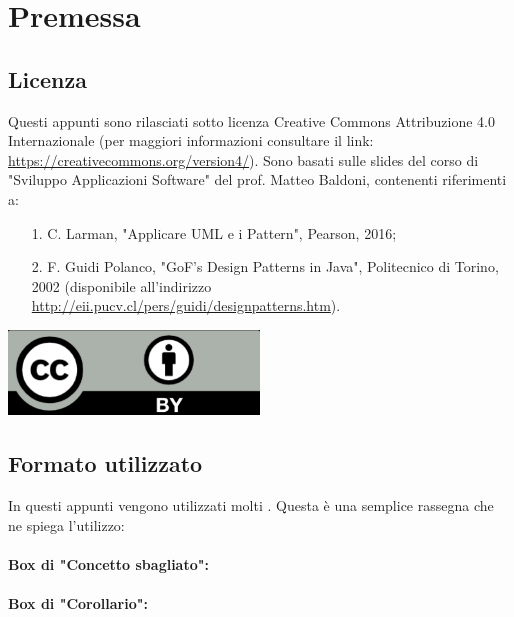\chapter{Premessa}

\section{Licenza}

Questi appunti sono rilasciati sotto licenza Creative Commons Attribuzione 4.0 Internazionale (per maggiori
informazioni consultare il link: \href{https://creativecommons.org/version4/}{https://creativecommons.org/version4/}). Sono basati sulle slides del corso di "Sviluppo Applicazioni Software" del prof. Matteo Baldoni, contenenti riferimenti a:
\begin{itemize}
    \item [1.] C. Larman, "Applicare UML e i Pattern", Pearson, 2016;
    \item [2.] F. Guidi Polanco, "GoF's Design Patterns in Java", Politecnico di Torino, 2002
    (disponibile all'indirizzo \href{http://eii.pucv.cl/pers/guidi/designpatterns.htm}{http://eii.pucv.cl/pers/guidi/designpatterns.htm}).
\end{itemize}

\begin{center}
    \includegraphics[width=0.5\textwidth]{images/cc.png}
\end{center}

\section{Formato utilizzato}

In questi appunti vengono utilizzati molti . Questa è una semplice 
rassegna che ne spiega l'utilizzo:

\subsubsection{Box di "Concetto sbagliato":}


\subsubsection{Box di "Corollario":}

